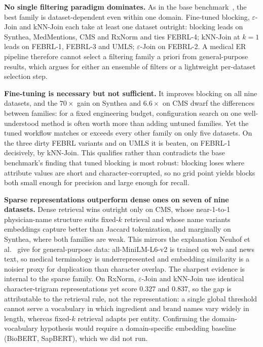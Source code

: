 \documentclass[runningheads]{llncs}
\begin{document}
\textbf{No single filtering paradigm dominates.} As in the base
benchmark~\cite{papadakis2023benchmarking,neuhof2024open}, the best family is dataset-dependent
even within one domain. Fine-tuned blocking, $\varepsilon$-Join and kNN-Join each take at least
one dataset outright: blocking leads on Synthea, MedMentions, CMS and RxNorm and ties FEBRL-4;
kNN-Join at $k=1$ leads on FEBRL-1, FEBRL-3 and UMLS; $\varepsilon$-Join on FEBRL-2. A medical
ER pipeline therefore cannot select a filtering family a priori from general-purpose results,
which argues for either an ensemble of filters or a lightweight per-dataset selection step.

\textbf{Fine-tuning is necessary but not sufficient.} It improves blocking on all nine
datasets, and the $70\times$ gain on Synthea and $6.6\times$ on CMS dwarf the differences
between families: for a fixed engineering budget, configuration search on one well-understood
method is often worth more than adding untuned families. Yet the tuned workflow matches or
exceeds every other family on only five datasets. On the three dirty FEBRL variants and on UMLS
it is beaten, on FEBRL-1 decisively, by kNN-Join. This qualifies rather than contradicts the
base benchmark's finding that tuned blocking is most robust: blocking loses where attribute
values are short and character-corrupted, so no grid point yields blocks both small enough for
precision and large enough for recall.

\textbf{Sparse representations outperform dense ones on seven of nine datasets.} Dense
retrieval wins outright only on CMS, whose near-1-to-1 physician-name structure suits fixed-$k$
retrieval and whose name variants embeddings capture better than Jaccard tokenization, and
marginally on Synthea, where both families are weak. This mirrors the explanation Neuhof et
al.~\cite{neuhof2024open} give for general-purpose data: all-MiniLM-L6-v2 is trained on web and
news text, so medical terminology is underrepresented and embedding similarity is a noisier
proxy for duplication than character overlap. The sharpest evidence is internal to the sparse
family. On RxNorm, $\varepsilon$-Join and kNN-Join use identical character-trigram
representations yet score 0.327 and 0.837, so the gap is attributable to the retrieval rule,
not the representation: a single global threshold cannot serve a vocabulary in which ingredient
and brand names vary widely in length, whereas fixed-$k$ retrieval adapts per entity.
Confirming the domain-vocabulary hypothesis would require a domain-specific embedding baseline
(BioBERT, SapBERT), which we did not run.
\end{document}
